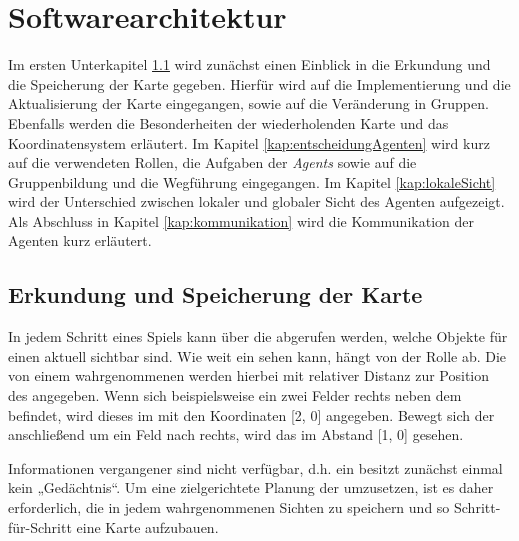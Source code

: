 \section{Softwarearchitektur}

Im ersten Unterkapitel \ref{erkundungDerKarte} wird zunächst einen Einblick in die Erkundung und die Speicherung der Karte gegeben. Hierfür wird auf die Implementierung und die Aktualisierung der Karte eingegangen, sowie auf die Veränderung in Gruppen. Ebenfalls werden die Besonderheiten der wiederholenden Karte und das Koordinatensystem erläutert. Im Kapitel \ref{kap:entscheidungAgenten} wird kurz auf die verwendeten Rollen, die Aufgaben der \textit{Agents} sowie auf die Gruppenbildung und die Wegführung eingegangen. Im Kapitel \ref{kap:lokaleSicht} wird der Unterschied zwischen lokaler und globaler Sicht des Agenten aufgezeigt. Als Abschluss in Kapitel \ref{kap:kommunikation} wird die Kommunikation der Agenten kurz erläutert.

\subsection{Erkundung und Speicherung der Karte} \label{erkundungDerKarte}

In jedem Schritt eines Spiels kann über die \Percepts abgerufen werden, welche Objekte für einen \Agent aktuell sichtbar sind. Wie weit ein \Agent sehen kann, hängt von der Rolle ab. Die von einem \Agent wahrgenommenen \Things werden hierbei mit relativer Distanz zur Position des \Agents angegeben. Wenn sich beispielsweise ein \Obstacle zwei Felder rechts neben dem \Agent befindet, wird dieses im \Percept mit den Koordinaten [2, 0] angegeben. Bewegt sich der \Agent anschließend um ein Feld nach rechts, wird das \Obstacle im Abstand [1, 0] gesehen. 

Informationen vergangener \Percepts sind nicht verfügbar, d.h. ein \Agent besitzt zunächst einmal kein „Gedächtnis“. Um eine zielgerichtete Planung der \Agents umzusetzen, ist es daher erforderlich, die in jedem \Step wahrgenommenen Sichten zu speichern und so Schritt-für-Schritt eine Karte aufzubauen. \\

